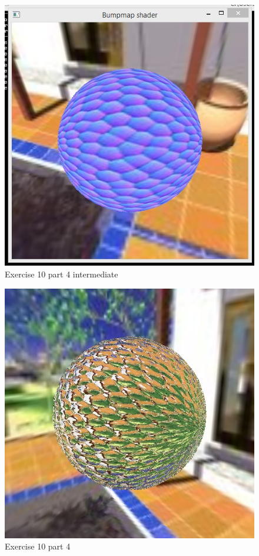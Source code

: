 \begin{figure}[ht!]
	\begin{center}
		\includegraphics[width=.6\textwidth]{figures/exercise_10_3}
	\end{center}
	\vspace{-4.5ex}\caption{Exercise 10 part 4 intermediate}
	\label{fig:exercise_10_3} 
\end{figure}

\begin{figure}[ht!]
	\begin{center}
		\includegraphics[width=.6\textwidth]{figures/exercise_10_4}
	\end{center}
	\vspace{-4.5ex}\caption{Exercise 10 part 4}
	\label{fig:exercise_10_4} 
\end{figure}

